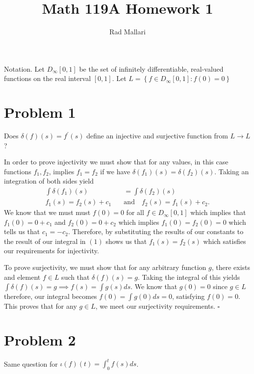 \documentclass[11pt]{article}
\title{Math 119A Homework 1}
\author{Rad Mallari}
\newcommand{\set}[1]{\left\{ #1\right\}}
\newenvironment{proof}{\noindent{\bf Proof.}}{\hfill $\square$\medskip}
\begin{document}
\maketitle

Notation. Let $D_{\infty}[0,1]$ be the set of infinitely differentiable, real-valued functions on the real interval $[0,1]$.
Let $L=\set{f\in D_{\infty}[0,1]:f(0)=0}$

\section{Problem 1}
Does $\delta(f)(s)=f^{\prime}(s)$ define an injective and surjective function from $L\rightarrow L$?

\begin{proof}
In order to prove injectivity we must show that for any values, in this case functions $f_{1},f_{2}$, implies
$f_{1}=f_{2}$ if we have $\delta(f_{1})(s)=\delta(f_{2})(s)$. Taking an integration of both sides yield
\begin{equation}
    \begin{split}
        \int\delta(f_{1})(s)&=\int\delta(f_{2})(s)\\
        f_{1}(s)=f_{2}(s)+c_{1}\quad&\text{and}\quad f_{2}(s)=f_{1}(s)+c_{2}.
    \end{split}
\end{equation}
We know that we must must $f(0)=0$ for all $f\in D_{\infty}[0,1]$ which implies that $f_{1}(0)=0+c_{1}$ and $f_{2}(0)=0+c_{2}$
which implies $f_{1}(0)=f_{2}(0)=0$ which tells us that $c_{1}=-c_{2}$. Therefore, by substituting the results of our constants 
to the result of our integral in $(1)$ shows us that $f_{1}(s)=f_{2}(s)$ which satisfies our requirements for injectivity.

To prove surjectivity, we must show that for any arbitrary function $g$, there exists and element $f\in L$ such that 
$\delta (f)(s)=g$. Taking the integral of this yields $\int\delta (f)(s)=g\implies f(s)=\int g(s)ds$. We know that $g(0)=0$ 
since $g\in L$ therefore, our integral becomes $f(0)=\int g(0)ds=0$, satisfying $f(0)=0$. This proves that for any $g\in L$, 
we meet our surjectivity requirements.
\end{proof}

\newpage
\section{Problem 2}
Same question for $\iota(f)(t)=\int_{0}^{t}f(s)ds$.
\end{document}
